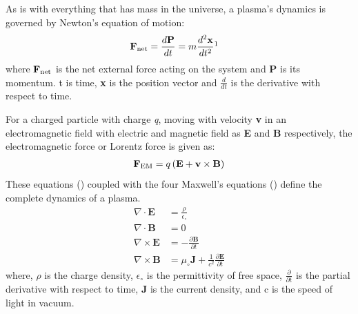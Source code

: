         As is with everything that has mass in the universe, a plasma's dynamics is governed by
        Newton's equation of motion:
        \begin{align}
            \mathbf{F}_{\rm net} = \frac{d \mathbf{P}}{d t} & = m \frac{d^2 \mathbf{x}}{d t^2} \protect\footnotemark \label{eq:nwtn1}
        \end{align}
         where $\mathbf{F}_{\rm
        net}$ is the net external force acting on the system and \textbf{P} is its momentum. t is
        time, \textbf{x} is the position vector and $\frac{d}{dt}$ is the derivative with respect to
        time.
        
        For a charged particle with charge \textit{q}, moving with velocity \textbf{v} in an
        electromagnetic field with electric and magnetic field as \textbf{E} and \textbf{B}
        respectively, the electromagnetic force or Lorentz force is given as:
        \begin{align}
            \mathbf{F}_{\rm EM} = q \left( \mathbf{E} + \mathbf{v} \times \mathbf{B} \right)
            \label{eq:lorentz}
        \end{align}
        These equations () coupled with the four Maxwell's equations
        () define the complete dynamics of a plasma.
        \begin{align}
            \nabla \cdot \mathbf{E} & = \frac{\rho}{\epsilon_\circ} \label{eq:maxwell1}\\
            \nabla \cdot \mathbf{B} & = 0 \label{eq:maxwell2}\\
            \nabla \times \mathbf{E} & = -\frac{\partial \mathbf{B}}{\partial t} \label{eq:maxwell3}\\
            \nabla \times \mathbf{B} & = \mu_\circ \mathbf{J} + \frac{1}{c^2} \frac{\partial \mathbf{E}}{\partial t} \label{eq:maxwell4}
        \end{align}
        where, $\rho$ is the charge density, $\epsilon_\circ$ is the permittivity of free space,
        $\frac{\partial}{\partial t}$ is the partial derivative with respect to time, $\mathbf{J}$
        is the current density, and c is the speed of light in vacuum.

